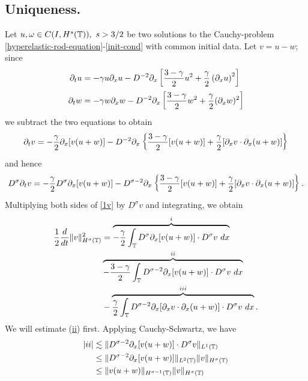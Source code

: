 \subsection{Uniqueness.}
%
%
Let $u,\omega \in C(I, H^s(\mathbb{T})), \ s > 3/2$ be two solutions to the
Cauchy-problem \eqref{hyperelastic-rod-equation}-\eqref{init-cond} with
common initial data. Let $v=u-w$; since
\begin{align*}
\partial_t u 
& = - \gamma u \partial_x u - D^{-2} \partial_x \left[ \frac{3-\gamma}{2} u^2 +
\frac{\gamma}{2}\left( \partial_x u \right)^2 \right]
\\
\partial_t w & = -\gamma w \partial_x w - D^{-2} \partial_x \left[
\frac{3-\gamma}{2} w^2 + \frac{\gamma}{2}(\partial_x w)^2 
\right]
\end{align*}
we subtract the two equations to obtain 
\begin{equation*}
\begin{split}
\partial_t v
= -\frac{\gamma}{2} \partial_x [v(u + w)] - D^{-2} \partial_x \left\{
\frac{3-\gamma}{2}[v(u+w)] + \frac{\gamma}{2}[\partial_x v \cdot \partial_x (u+w)]
\right\}
\end{split}
\end{equation*}
and hence
\begin{equation}
\begin{split}
D^\sigma \partial_t v = -\frac{\gamma}{2} D^\sigma \partial_x [v(u+w)] - D^{\sigma -2} \partial_x
\left\{ \frac{3-\gamma}{2} [v(u+w)] + \frac{\gamma}{2} [\partial_x v
\cdot \partial_x
(u+w)]
\right\}.
\label{1v}
\end{split}
\end{equation}
Multiplying both sides of \eqref{1v} by $D^\sigma v$ and integrating, we obtain
\begin{equation}
\begin{split}
\frac{1}{2} \frac{d}{dt} \|v\|_{H^\sigma(\mathbb{T})}^2
& =  \overbrace{-\frac{\gamma}{2} \int_{\mathbb{T}} D^\sigma \partial_x [v(u+w)] \cdot
D^\sigma v \ dx}^i
\\
& \overbrace{- \frac{3-\gamma}{2} \int_{\mathbb{T}}  D^{\sigma -2}
\partial_x[v(u+w)] \cdot
D^\sigma v \ dx}^{ii} 
\\
& - \overbrace{\frac{\gamma}{2} \int_{\mathbb{T}} D^{\sigma -2} \partial_x [ \partial_x v
\cdot \partial_x (u+w)]\cdot D^\sigma v \ dx }^{iii}.
\label{2v}
\end{split}
\end{equation}
We will estimate (\hyperref[2v]{ii}) first.
Applying Cauchy-Schwartz, we have 
\begin{equation*}
\begin{split}
|ii|
& \lesssim  \|D^{\sigma -2}
\partial_x [v(u+w)] \cdot D^\sigma
v  \|_{L^1(\mathbb{T})}
\\
& \le   \|D^{\sigma -2} \partial_x [v(u+w)]
\|_{L^2(\mathbb{T})} \|v\|_{H^\sigma(\mathbb{T})}
\\
& \le \|v(u+w)\|_{H^{\sigma -1}(\mathbb{T})} \|v\|_{H^\sigma(\mathbb{T})}
\end{split}
\end{equation*}
